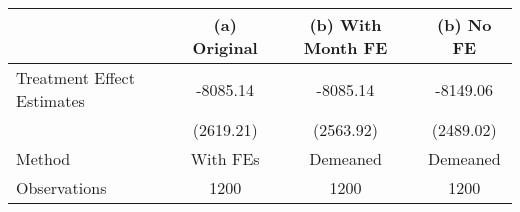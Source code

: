 \begin{tabular}{l*{3}{c}}
\hline\hline
                    &\multicolumn{1}{c}{(a) Original}&\multicolumn{1}{c}{(b) With Month FE}&\multicolumn{1}{c}{(b) No FE}\\
\hline
Treatment Effect Estimates&    -8085.14&    -8085.14&    -8149.06\\
                    &   (2619.21)&   (2563.92)&   (2489.02)\\
\hline
Method              &    With FEs&    Demeaned&    Demeaned\\
Observations        &        1200&        1200&        1200\\
\hline\hline
\end{tabular}
